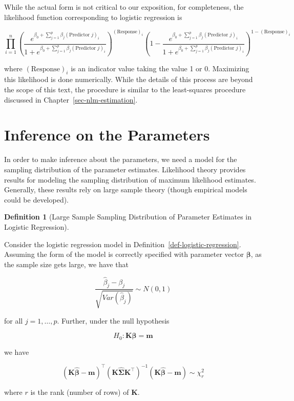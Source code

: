 \documentclass[
  letterpaper,
  DIV=11,
  numbers=noendperiod]{scrreprt}
\theoremstyle{definition}
\newtheorem{definition}{Definition}[chapter]
\theoremstyle{definition}
\theoremstyle{remark}
\begin{document}
While the actual form is not critical to our exposition, for
completeness, the likelihood function corresponding to logistic
regression is

\[\prod_{i=1}^{n} \left(\frac{e^{\beta_0 + \sum_{j=1}^{p} \beta_j (\text{Predictor } j)_i}}{1 + e^{\beta_0 + \sum_{j=1}^{p} \beta_j (\text{Predictor } j)_i}}\right)^{(\text{Response})_i}\left(1 - \frac{e^{\beta_0 + \sum_{j=1}^{p} \beta_j (\text{Predictor } j)_i}}{1 + e^{\beta_0 + \sum_{j=1}^{p} \beta_j (\text{Predictor } j)_i}}\right)^{1 - (\text{Response})_i}\]

where \((\text{Response})_i\) is an indicator value taking the value 1
or 0. Maximizing this likelihood is done numerically. While the details
of this process are beyond the scope of this text, the procedure is
similar to the least-squares procedure discussed in
Chapter~\ref{sec-nlm-estimation}.

\hypertarget{inference-on-the-parameters-1}{%
\section{Inference on the
Parameters}\label{inference-on-the-parameters-1}}

In order to make inference about the parameters, we need a model for the
sampling distribution of the parameter estimates. Likelihood theory
provides results for modeling the sampling distribution of maximum
likelihood estimates. Generally, these results rely on large sample
theory (though empirical models could be developed).

\begin{definition}[Large Sample Sampling Distribution of Parameter
Estimates in Logistic
Regression]\protect\hypertarget{def-nlm-logistic-samp-distns}{}\label{def-nlm-logistic-samp-distns}

Consider the logistic regression model in
Definition~\ref{def-logistic-regression}. Assuming the form of the model
is correctly specified with parameter vector \(\boldsymbol{\beta}\), as
the sample size gets large, we have that

\[\frac{\widehat{\beta}_j - \beta_j}{\sqrt{Var\left(\widehat{\beta}_j\right)}} \sim N(0, 1)\]

for all \(j = 1, \dotsc, p\). Further, under the null hypothesis

\[H_0: \mathbf{K}\boldsymbol{\beta} = \mathbf{m}\]

we have

\[\left(\mathbf{K}\widehat{\boldsymbol{\beta}} - \mathbf{m}\right)^\top \left(\mathbf{K}\widehat{\boldsymbol{\Sigma}}\mathbf{K}^\top\right)^{-1} \left(\mathbf{K}\widehat{\boldsymbol{\beta}} - \mathbf{m}\right) \sim \chi^2_r\]

where \(r\) is the rank (number of rows) of \(\mathbf{K}\).

\end{definition}
\end{document}
